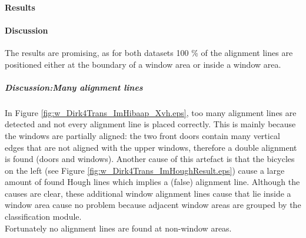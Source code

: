 
\newpage
\paragraph{Results}


\clearpage

\paragraph{Discussion}
The results are promising, as for both datasets 100 \% of the alignment lines
are positioned either at the boundary of a window area or inside a window area.

\subparagraph{Discussion:Many alignment lines}
In Figure \ref{fig:w_Dirk4Trans_ImHibaap_Xvh.eps}, too many alignment lines are
detected and not every alignment line is placed correctly.  This is mainly
because the windows are partially aligned: the two front doors contain many
vertical edges that are not aligned with the upper windows, therefore a double alignment
is found (doors and windows).  Another cause of this artefact is that the
bicycles on the left (see Figure \ref{fig:w_Dirk4Trans_ImHoughResult.eps}) cause
a large amount of found Hough lines which implies a (false) alignment line.
Although the causes are clear, these additional
window alignment lines cause that lie inside a window area cause no problem
because adjacent window areas are grouped by the classification module.\\
Fortunately no alignment lines are found at non-window areas.


